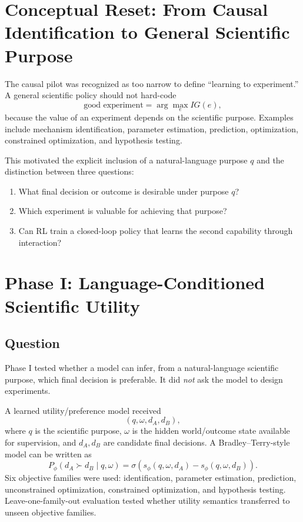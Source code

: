 \documentclass[11pt]{article}
\begin{document}
\section{Conceptual Reset: From Causal Identification to General Scientific Purpose}
The causal pilot was recognized as too narrow to define ``learning to experiment.'' A general scientific policy should not hard-code
\[
\text{good experiment}=\arg\max_e IG(e),
\]
because the value of an experiment depends on the scientific purpose. Examples include mechanism identification, parameter estimation, prediction, optimization, constrained optimization, and hypothesis testing.

This motivated the explicit inclusion of a natural-language purpose $q$ and the distinction between three questions:
\begin{enumerate}
    \item What final decision or outcome is desirable under purpose $q$?
    \item Which experiment is valuable for achieving that purpose?
    \item Can RL train a closed-loop policy that learns the second capability through interaction?
\end{enumerate}

\section{Phase I: Language-Conditioned Scientific Utility}
\subsection{Question}
Phase I tested whether a model can infer, from a natural-language scientific purpose, which final decision is preferable. It did \emph{not} ask the model to design experiments.

A learned utility/preference model received
\[
(q,\omega,d_A,d_B),
\]
where $q$ is the scientific purpose, $\omega$ is the hidden world/outcome state available for supervision, and $d_A,d_B$ are candidate final decisions. A Bradley--Terry-style model can be written as
\[
P_\phi(d_A\succ d_B\mid q,\omega)
=\sigma\!\left(s_\phi(q,\omega,d_A)-s_\phi(q,\omega,d_B)\right).
\]
Six objective families were used: identification, parameter estimation, prediction, unconstrained optimization, constrained optimization, and hypothesis testing. Leave-one-family-out evaluation tested whether utility semantics transferred to unseen objective families.
\end{document}

